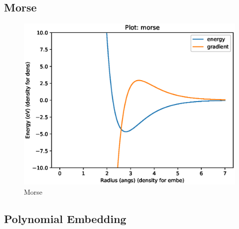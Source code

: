 
\FloatBarrier
\subsection{Morse}





\FloatBarrier
\begin{figure}[h]
  \begin{center}
    \includegraphics[width=0.7\linewidth]{appendix/functions/pots_plots/morse.eps}
    \caption{Morse}
    \label{figure:functionsmorse}
  \end{center}
\end{figure}





\FloatBarrier
\subsection{Polynomial Embedding}





